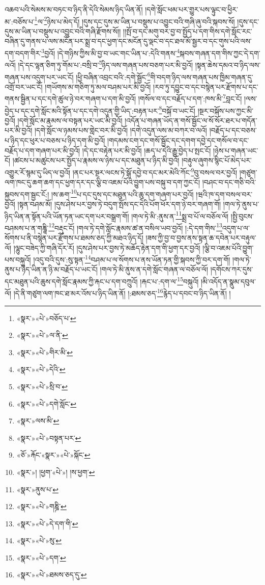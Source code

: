 འཆབ་པའི་སེམས་མ་བཏང་བ་ཉིད་ནི་དེའི་སེམས་ཉིད་ཡིན་ནོ། །དགེ་སློང་ཕམ་པར་གྱུར་པས་ལྟུང་བ་ཕྱིར་མ་:བཅོས་པ་\footnote{«སྣར་»«པེ་»བཅོད་པ་}ལ་\footnote{«སྣར་»«པེ་»ལ་ནི་}ཉེས་པ་མེད་དོ། །དུས་དང་དུས་མ་ཡིན་པ་བསྡུས་པ་འབྱུང་བའི་གཞི་ཞུ་བའི་སྐབས་སོ། །དུས་དང་དུས་མ་ཡིན་པ་བསྡུས་པ་འབྱུང་བའི་གཞི་རྫོགས་སོ།། །།སྤོ་བ་དང་མགུ་བར་བྱ་བ་སྤྱོད་པ་དག་གིས་དགེ་སློང་རང་བཞིན་དུ་གནས་པ་ལས་མངོན་པར་སྨྲ་བ་དང་ཕྱག་དང་མངོན་དུ་ལྡང་བ་དང་ཐལ་མོ་སྦྱར་བ་དང་གུས་པའི་ལས་དག་བདག་གིར་\footnote{«སྣར་»«པེ་»གིར་མི་}བྱའོ། །དེ་གཉིས་ཀྱིས་མི་བྱ་བ་ཡང་གང་ཡིན་པ་:དེའི་གནས་\footnote{«སྣར་»«པེ་»དེའི་}སྐབས་གཞན་དག་གིས་ཀྱང་དེ་དག་ལའོ། །དེ་དང་ལྷན་ཅིག་ཏུ་གོམ་པ་:བསྲི་བ་\footnote{«སྣར་»«པེ་»སྲི་བ་}ཉིད་ལས་གཞན་པས་བཅག་པར་མི་བྱའོ། །སྟན་ཆེས་དམའ་བ་ཉིད་ལས་གཞན་པས་འདུག་པར་ཡང་ངོ། །ཕྱི་བཞིན་འབྲང་བའི་:དགེ་སྦྱོང་\footnote{«སྣར་»«པེ་»དགེ་སློང་}གི་བདག་ཉིད་ལས་གཞན་པས་ཁྱིམ་གཞན་དུ་འགྲོ་བར་ཡང་ངོ། །གཡོགས་མ་གཅིག་ཏུ་མལ་བཤམ་པར་མི་བྱའོ། །རབ་ཏུ་དབྱུང་བ་དང་བསྙེན་པར་རྫོགས་པ་དང་གནས་སྦྱིན་པ་དང་དགེ་ཚུལ་ཉེ་བར་གཞག་པ་དག་མི་བྱའོ། །གསོལ་བ་དང་བརྗོད་པ་དག་:ཁས་མི་\footnote{«སྣར་»ལས་མི་}བླང་ངོ། །ལས་བྱེད་པ་དང་དགེ་སློང་མའི་སྟོན་པ་དང་དགེ་འདུན་གྱི་ཡིད་:བརྟན་པར་\footnote{«སྣར་»«པེ་»བསྟན་པར་}བསྐོ་བ་ཡང་ངོ། །སྔར་བསྐོས་པས་ཀྱང་མི་བྱའོ། །དགེ་སློང་མ་རྣམས་ལ་བསྟན་པར་ཡང་མི་བྱའོ། །འདོན་པ་གཞན་ཡོད་ན་གསོ་སྦྱོང་ལ་སོ་སོར་ཐར་པ་གདོན་པར་མི་བྱའོ། །དགེ་སློང་ལ་ཉམས་པས་གླེང་བར་མི་བྱའོ། །དགེ་འདུན་ལས་མ་བཀར་བ་ལའོ། །བརྗོད་པ་དང་བཅས་པ་ཉིད་དང་ཕུར་པ་བཅས་པ་ཉིད་དག་མི་བྱའོ། །གདམས་ངག་དང་གསོ་སྦྱོང་དང་དགག་དབྱེ་དང་གསོལ་བ་དང་བརྗོད་པ་དག་གཞག་པར་མི་བྱའོ། །དེ་དང་བརྟེན་པར་མི་བྱའོ། །ཆད་པ་དེའི་རྒྱུ་བྱེད་པ་སྤང་ངོ། །ཉེས་པ་གཞན་ཡང་ངོ། །ཚངས་པ་མཚུངས་པར་སྤྱོད་པ་རྣམས་ལ་ཉེས་པ་དང་མཐུན་པ་ཉིད་མི་བྱའོ། །བརྟུལ་ཞུགས་སྙིང་པོ་མེད་པར་འགྱུར་རོ་སྙམ་དུ་ཡིད་ལ་བྱའོ། །ནང་པར་སྔར་ལངས་ཏེ་སྒོ་དབྱེ་བ་དང་མར་མེའི་ཀོང་\footnote{«ཅོ་»རྐོང་«སྣར་»«པེ་»སྐོང་}བུ་བསལ་བར་བྱའོ། །གཙུག་ལག་ཁང་དུ་ཆག་ཆག་དང་ཕྱག་དར་དང་ལྕི་བ་འཇམ་པོའི་བྱུག་པས་བསྐུ་བ་དག་ཀྱང་ངོ། །བཤང་བ་དང་གཅི་བའི་སྐྱབས་དག་སྦྱང་ངོ:། །ས་ཆག་\footnote{«སྣར་»། །ཕྱག་«པེ་»། །ས་ཕྱག་}པ་དང་དུས་དང་མཐུན་པའི་ཆུ་དག་གཞག་པར་བྱའོ། །ཝའི་ཁ་དག་བསལ་བར་བྱའོ། །སྟན་བཤམ་མོ། །དུས་ཤེས་པར་བྱས་ཏེ་བདུག་སྤོས་དང་དེའི་པོག་ཕོར་དག་ཉེ་བར་གཞག་གོ། །གལ་ཏེ་ནུས་པ་ཉིད་ཡིན་ན་སྟོན་པའི་ཡོན་ཏན་ཡང་དག་པར་བསྒྲག་གོ། །གལ་ཏེ་མི་:ནུས་ན་\footnote{«སྣར་»ནུས་པ་}སྨྲ་བ་པོ་ལ་བཅོལ་ལོ། །སྤྱི་བུངས་བཤམས་པ་ན་གཎྜཱི་\footnote{«སྣར་»«པེ་»གཎྜི་}བརྡུང་ངོ། །གལ་ཏེ་དགེ་སློང་རྣམས་ཚ་ན་བསིལ་ཡབ་བྱའོ། །:དེ་དག་གིས་\footnote{«སྣར་»«པེ་»དེ་དག་གི་}འདུག་པ་ལ་སོགས་པ་ནི་བསྙེན་པར་རྫོགས་པ་ཐམས་ཅད་ཀྱི་མཐའ་ཉིད་དོ། །ཟས་ཀྱི་བྱ་བ་བྱས་ནས་སྟན་ཆ་དབེན་པར་བརྟུལ་ལོ། །ལྷུང་བཟེད་ཀྱི་གཞི་དོར་རོ། །དུས་ཤེས་པར་བྱས་ཏེ་མཆོད་རྟེན་དག་གི་ཕྱག་དར་བྱའོ། །ལྕི་བ་འཇམ་པོའི་བྱུག་པས་བསྐུའོ། །འདུ་བའི་དུས་:སུ་སྟན་\footnote{«སྣར་»«པེ་»སུ་}བཤམ་པ་ལ་སོགས་པ་ནས་ཡོན་ཏན་གྱི་སྐབས་ཀྱི་བར་དག་གོ། །གལ་ཏེ་ནུས་པ་ཉིད་ཡིན་ན་ཉི་མ་བརྗོད་པ་ཡང་ངོ། །གལ་ཏེ་མི་ནུས་ན་དགེ་སློང་གཞན་ལ་བཅོལ་ལོ། །དགོངས་ཀར་དུས་དང་མཐུན་པའི་ཆུས་དགེ་སློང་རྣམས་ཀྱི་རྐང་པ་དག་བཀྲུའོ། །རྐང་པ་:དག་ལ་\footnote{«སྣར་»«པེ་»དག་}བསྐུའོ། །མི་འདོད་ན་སྣུམ་དབུལ་ལོ། །དེ་ནི་གཙུག་ལག་ཁང་ཐ་མར་འོས་པ་ཉིད་ཡིན་ནོ། །:ཐམས་ཅད་\footnote{«སྣར་»«པེ་»ཐམས་ཅད་དུ་}རྙེད་པ་དབང་བ་ཉིད་ཡིན་ནོ། །
